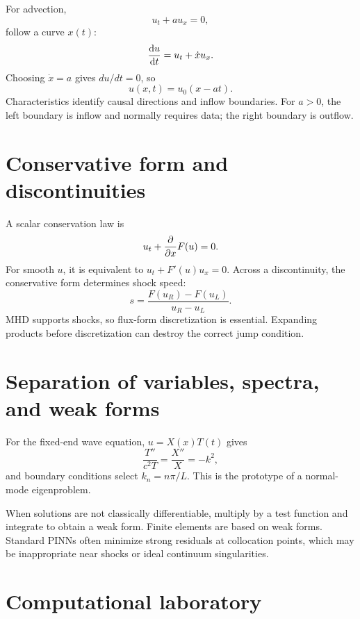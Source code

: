 \documentclass[11pt]{article}
\begin{document}
For advection,
\begin{equation}
u_t+au_x=0,
\end{equation}
follow a curve $x(t)$:
\begin{equation}
\dv{u}{t}=u_t+\dot xu_x.
\end{equation}
Choosing $\dot x=a$ gives $du/dt=0$, so
\begin{equation}
u(x,t)=u_0(x-at).
\end{equation}
Characteristics identify causal directions and inflow boundaries. For $a>0$, the left boundary is inflow and normally requires data; the right boundary is outflow.


\section{Conservative form and discontinuities}

A scalar conservation law is
\begin{equation}
u_t+\pdv{}{x}F(u)=0.
\end{equation}
For smooth $u$, it is equivalent to $u_t+F'(u)u_x=0$. Across a discontinuity, the conservative form determines shock speed:
\begin{equation}
s=\frac{F(u_R)-F(u_L)}{u_R-u_L}.
\end{equation}
MHD supports shocks, so flux-form discretization is essential. Expanding products before discretization can destroy the correct jump condition.


\section{Separation of variables, spectra, and weak forms}

For the fixed-end wave equation, $u=X(x)T(t)$ gives
\begin{equation}
\frac{T''}{c^2T}=\frac{X''}{X}=-k^2,
\end{equation}
and boundary conditions select $k_n=n\pi/L$. This is the prototype of a normal-mode eigenproblem.

When solutions are not classically differentiable, multiply by a test function and integrate to obtain a weak form. Finite elements are based on weak forms. Standard PINNs often minimize strong residuals at collocation points, which may be inappropriate near shocks or ideal continuum singularities.


\section{Computational laboratory}
\end{document}
